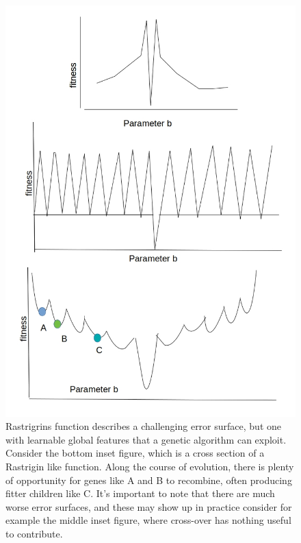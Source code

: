 \begin{figure}
\centering
      \label{fig:test1}
      \centering
      \includegraphics[scale=0.85]{figures/spectrum_worst_error_surfaces2.jpg}
      \caption[Hypothetical Error Functions, Worse than Rastrigrins function]{Rastrigrins function describes a challenging error surface, but one with learnable global features that a genetic algorithm can exploit. Consider the bottom inset figure, which is a cross section of a Rastrigin like function. Along the course of evolution, there is plenty of opportunity for genes like A and B to recombine, often producing fitter children like C. It's important to note that there are much worse error surfaces, and these may show up in practice consider for example the middle inset figure, where cross-over has nothing useful to contribute.
}
\end{figure}

